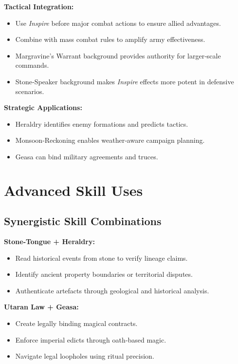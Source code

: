 \textbf{Tactical Integration:}
\begin{itemize}
    \item Use \emph{Inspire} before major combat actions to ensure allied advantages.
    \item Combine with mass combat rules to amplify army effectiveness.
    \item Margravine's Warrant background provides authority for larger‑scale commands.
    \item Stone‑Speaker background makes \emph{Inspire} effects more potent in defensive scenarios.
\end{itemize}

\textbf{Strategic Applications:}
\begin{itemize}
    \item Heraldry identifies enemy formations and predicts tactics.
    \item Monsoon‑Reckoning enables weather‑aware campaign planning.
    \item Geasa can bind military agreements and truces.
\end{itemize}

\section{Advanced Skill Uses}\label{sec:advanced_skills}

\subsection{Synergistic Skill Combinations}\label{subsec:skill_synergies}

\textbf{Stone‑Tongue + Heraldry:}
\begin{itemize}
    \item Read historical events from stone to verify lineage claims.
    \item Identify ancient property boundaries or territorial disputes.
    \item Authenticate artefacts through geological and historical analysis.
\end{itemize}

\textbf{Utaran Law + Geasa:}
\begin{itemize}
    \item Create legally binding magical contracts.
    \item Enforce imperial edicts through oath‑based magic.
    \item Navigate legal loopholes using ritual precision.
\end{itemize}

